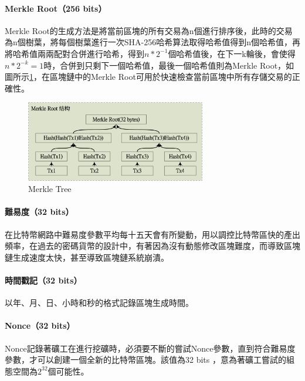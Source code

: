 			\paragraph{Merkle Root（256 bits）}Merkle Root的生成方法是將當前區塊的所有交易為n個進行排序後，此時的交易為n個樹葉，將每個樹葉進行一次SHA-256哈希算法取得哈希值得到n個哈希值，再將哈希值兩兩配對合併進行哈希，得到$n*2^{-1}$個哈希值後，在下一k輪後，會使得$n*2^{-k}=1$時，合併到只剩下一個哈希值，最後一個哈希值則為Merkle Root，如圖所示\ref{MerkleRoot}，在區塊鏈中的Merkle Root可用於快速檢查當前區塊中所有存儲交易的正確性。

			\begin{figure}[h]
				\centering
				\includegraphics[width = 0.7\textwidth]{MerkleRoot.png}
				\caption{Merkle Tree}\label{MerkleRoot}
			\end{figure}

			
			\paragraph{難易度（32 bits）}在比特幣網路中難易度參數平均每十五天會有所變動，用以調控比特幣區快的產出頻率，在過去的密碼貨幣的設計中，有著因為沒有動態修改區塊難度，而導致區塊鏈生成速度太快，甚至導致區塊鏈系統崩潰。
			\paragraph{時間戳記（32 bits）}以年、月、日、小時和秒的格式記錄區塊生成時間。
			\paragraph{Nonce（32 bits）}Nonce記錄著礦工在進行挖礦時，必須要不斷的嘗試Nonce參數，直到符合難易度參數，才可以創建一個全新的比特幣區塊。該值為32 bits ，意為著礦工嘗試的組態空間為$2^{32}$個可能性。



